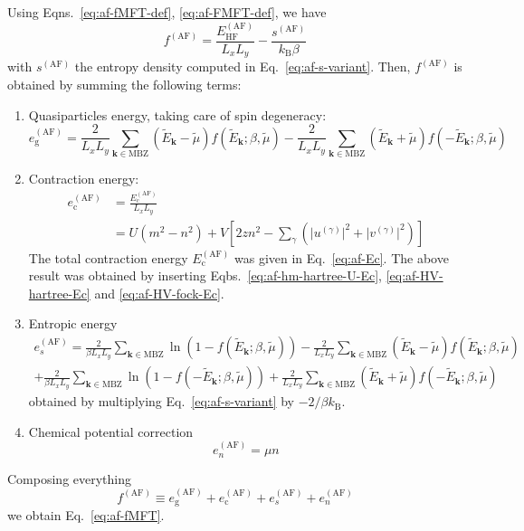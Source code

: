 \begin{tabproof}
	
	Using Eqns.~\eqref{eq:af-fMFT-def}, \eqref{eq:af-FMFT-def}, we have
	\[
		f^{(\mathrm{AF})} = \frac{E_\mathrm{HF}^{(\mathrm{AF})}}{L_x L_y} - \frac{s^{(\mathrm{AF})}}{k_\mathrm{B} \beta}
	\]
	with $s^{(\mathrm{AF})}$ the entropy density computed in Eq.~\eqref{eq:af-s-variant}. Then, $f^{(\mathrm{AF})}$ is obtained by summing the following terms:
	\begin{enumerate}
		\item Quasiparticles energy, taking care of spin degeneracy:
		\[
		e_\mathrm{g}^{(\mathrm{AF})} = \frac{2}{L_x L_y} \sum_{\mathbf{k} \in \mathrm{MBZ}} (\tilde{E}_\mathbf{k} - \tilde{\mu}) f( \tilde{E}_\mathbf{k}; \beta,\tilde{\mu}) - \frac{2}{L_x L_y} \sum_{\mathbf{k} \in \mathrm{MBZ}} (\tilde{E}_\mathbf{k} + \tilde{\mu}) f( -\tilde{E}_\mathbf{k}; \beta,\tilde{\mu})
		\]
		\item Contraction energy:
		\[
		\begin{aligned}
			e_\mathrm{c}^{(\mathrm{AF})} &= \frac{E_\mathrm{c}^{(\mathrm{AF})}}{L_x L_y} \\
			&= U(m^2 - n^2) + V \left[
			2zn^2 - \sum_{\gamma} \left(
			\big|u^{(\gamma)}\big|^2 + \big|v^{(\gamma)}\big|^2
			\right)
			\right]
		\end{aligned}
		\]
		The total contraction energy $E_\mathrm{c}^{(\mathrm{AF})}$ was given in Eq.~\eqref{eq:af-Ec}. The above result was obtained by inserting Eqbs.~\eqref{eq:af-hm-hartree-U-Ec}, \eqref{eq:af-HV-hartree-Ec} and \eqref{eq:af-HV-fock-Ec}.
		\item Entropic energy
		\begin{multline*}
			e_s^{(\mathrm{AF})} = \frac{2}{\beta L_x L_y} \sum_{\mathbf{k}\in\mathrm{MBZ}} \ln \left(
			1- f( \tilde{E}_\mathbf{k}; \beta,\tilde{\mu}) \right) - \frac{2}{L_x L_y} \sum_{\mathbf{k}\in\mathrm{MBZ}} (\tilde{E}_\mathbf{k}-\tilde{\mu}) f( \tilde{E}_\mathbf{k}; \beta,\tilde{\mu}) \\
			+ \frac{2}{\beta L_x L_y} \sum_{\mathbf{k}\in\mathrm{MBZ}} \ln \left(
			1- f( -\tilde{E}_\mathbf{k}; \beta,\tilde{\mu}) \right) + \frac{2}{L_x L_y} \sum_{\mathbf{k}\in\mathrm{MBZ}} (\tilde{E}_\mathbf{k}+\tilde{\mu}) f( -\tilde{E}_\mathbf{k}; \beta,\tilde{\mu})
		\end{multline*}
		obtained by multiplying Eq.~\eqref{eq:af-s-variant} by $-2/\beta k_\mathrm{B}$.
		\item Chemical potential correction
		\[
		e_n^{(\mathrm{AF})} = \mu n
		\]
	\end{enumerate}
	Composing everything
	\[
	f^{(\mathrm{AF})} \equiv e_\mathrm{g}^{(\mathrm{AF})} + e_\mathrm{c}^{(\mathrm{AF})} + e_s^{(\mathrm{AF})} + e_n^{(\mathrm{AF})}
	\]
	we obtain Eq.~\eqref{eq:af-fMFT}.
	
\end{tabproof}

